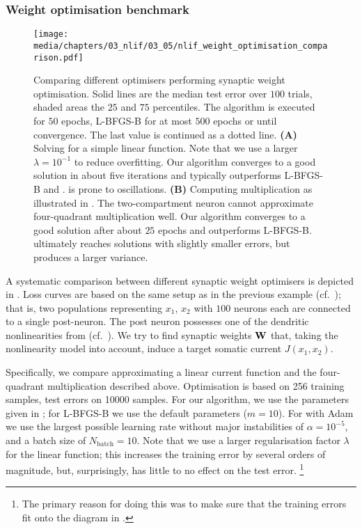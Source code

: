 \pagebreak

\subsubsection{Weight optimisation benchmark}

\begin{figure}
	\centering
	\texttt{[image: media/chapters/03\_nlif/03\_05/nlif\_weight\_optimisation\_comparison.pdf]}%
	{\label{fig:nlif_weight_optimisation_comparison_a}}%
	{\label{fig:nlif_weight_optimisation_comparison_b}}%
	\caption[Comparing different optimisers performing synaptic weight optimisation]{Comparing different optimisers performing synaptic weight optimisation.
	Solid lines are the median test error over $100$ trials, shaded areas the $25$ and $75$ percentiles.
	The \SQP algorithm is executed for $50$ epochs, L-BFGS-B for at most $500$ epochs or until convergence.
	The last value is continued as a dotted line.
	\textbf{(A)} Solving for a simple linear function. Note that we use a larger $\lambda = 10^{-1}$ to reduce overfitting. Our \SQP algorithm converges to a good solution in about five iterations and typically outperforms L-BFGS-B and \SGD. \SGD is prone to oscillations.
	\textbf{(B)} Computing multiplication as illustrated in .
	The two-compartment neuron cannot approximate four-quadrant multiplication well.
	Our \SQP algorithm converges to a good solution after about $25$ epochs and outperforms L-BFGS-B.
	\SGD ultimately reaches solutions with slightly smaller errors, but produces a larger variance.
	}
	\label{fig:nlif_weight_optimisation_comparison}
\end{figure}

A systematic comparison between different synaptic weight optimisers is depicted in .
Loss curves are based on the same setup as in the previous example (cf.~); that is, two populations representing $x_1$, $x_2$ with $100$ neurons each are connected to a single post-neuron.
The post neuron possesses one of the dendritic nonlinearities from  (cf.~).
We try to find synaptic weights $\mathbf{W}$ that, taking the nonlinearity model into account, induce a target somatic current $J(x_1, x_2)$.

Specifically, we compare approximating a linear current function and the four-quadrant multiplication described above.
Optimisation is based on \num{256} training samples, test errors on \num{10000} samples.
For our algorithm, we use the parameters given in ; for L-BFGS-B we use the default parameters ($m = 10$).
For \SGD with Adam we use the largest possible learning rate without major instabilities of $\alpha = 10^{-5}$, and a batch size of $N_\mathrm{batch} = 10$.
Note that we use a larger regularisation factor $\lambda$ for the linear function; this increases the training error by several orders of magnitude, but, surprisingly, has little to no effect on the test error.%
\footnote{The primary reason for doing this was to make sure that the training errors fit onto the diagram in .}

